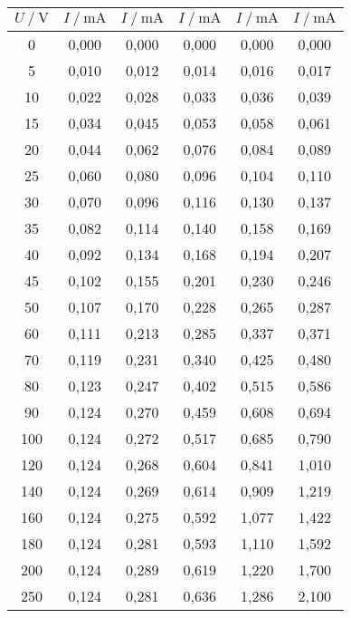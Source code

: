 \begin{table}
\begin{tabular}{c c c c c c}
    $U \mathbin{/} \unit{\volt}$ &
    $I \mathbin{/} \unit{\milli\ampere}$ &
    $I \mathbin{/} \unit{\milli\ampere}$ &
    $I \mathbin{/} \unit{\milli\ampere}$ & 
    $I \mathbin{/} \unit{\milli\ampere}$ &
    $I \mathbin{/} \unit{\milli\ampere}$ \\
    \midrule
       0 & 0,000 &   0,000 &   0,000 &   0,000 &   0,000 \\
       5 & 0,010 &   0,012 &   0,014 &   0,016 &   0,017 \\
      10 & 0,022 &   0,028 &   0,033 &   0,036 &   0,039 \\
      15 & 0,034 &   0,045 &   0,053 &   0,058 &   0,061 \\
      20 & 0,044 &   0,062 &   0,076 &   0,084 &   0,089 \\
      25 & 0,060 &   0,080 &   0,096 &   0,104 &   0,110 \\
      30 & 0,070 &   0,096 &   0,116 &   0,130 &   0,137 \\
      35 & 0,082 &   0,114 &   0,140 &   0,158 &   0,169 \\
      40 & 0,092 &   0,134 &   0,168 &   0,194 &   0,207 \\
      45 & 0,102 &   0,155 &   0,201 &   0,230 &   0,246 \\
      50 & 0,107 &   0,170 &   0,228 &   0,265 &   0,287 \\
      60 & 0,111 &   0,213 &   0,285 &   0,337 &   0,371 \\
      70 & 0,119 &   0,231 &   0,340 &   0,425 &   0,480 \\
      80 & 0,123 &   0,247 &   0,402 &   0,515 &   0,586 \\
      90 & 0,124 &   0,270 &   0,459 &   0,608 &   0,694 \\
     100 & 0,124 &   0,272 &   0,517 &   0,685 &   0,790 \\
     120 & 0,124 &   0,268 &   0,604 &   0,841 &   1,010 \\
     140 & 0,124 &   0,269 &   0,614 &   0,909 &   1,219 \\
     160 & 0,124 &   0,275 &   0,592 &   1,077 &   1,422 \\
     180 & 0,124 &   0,281 &   0,593 &   1,110 &   1,592 \\
     200 & 0,124 &   0,289 &   0,619 &   1,220 &   1,700 \\
     250 & 0,124 &   0,281 &   0,636 &   1,286 &   2,100 \\
  \bottomrule
  \end{tabular}
\end{table}

